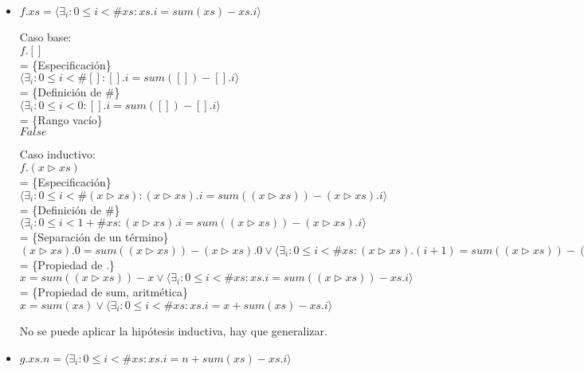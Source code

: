 \documentclass[12pt]{article}
\begin{document}
\begin{itemize}
    \item $ f.xs = \langle \exists_i : 0 \le i < \#xs : xs.i = sum(xs) - xs.i \rangle $

    \bigbreak 

    Caso base:\\
    $ f.[] $\\
    = \{Especificación\}\\
    $ \langle \exists_i : 0 \le i < \#[] : [].i = sum([]) - [].i \rangle $\\
    = \{Definición de \#\}\\
    $ \langle \exists_i : 0 \le i < 0 : [].i = sum([]) - [].i \rangle $\\
    = \{Rango vacío\}\\
    $ False $

    \bigbreak

    Caso inductivo:\\
    $ f.(x \triangleright xs) $\\
    = \{Especificación\}\\
    $ \langle \exists_i : 0 \le i < \#(x \triangleright xs) : (x \triangleright xs).i = sum((x \triangleright xs)) - (x \triangleright xs).i \rangle $\\
    = \{Definición de \#\}\\
    $ \langle \exists_i : 0 \le i < 1 + \#xs : (x \triangleright xs).i = sum((x \triangleright xs)) - (x \triangleright xs).i \rangle $\\
    = \{Separación de un término\}\\
    $ (x \triangleright xs).0 = sum((x \triangleright xs)) - (x \triangleright xs).0 \lor \langle \exists_i : 0 \le i < \#xs : (x \triangleright xs).(i + 1) = sum((x \triangleright xs)) - (x \triangleright xs).(i + 1) \rangle $\\
    = \{Propiedad de .\}\\
    $ x = sum((x \triangleright xs)) - x \lor \langle \exists_i : 0 \le i < \#xs : xs.i = sum((x \triangleright xs)) - xs.i \rangle $\\
    = \{Propiedad de sum, aritmética\}\\
    $ x = sum(xs) \lor \langle \exists_i : 0 \le i < \#xs : xs.i = x + sum(xs) - xs.i \rangle $

    \bigbreak

    No se puede aplicar la hipótesis inductiva, hay que generalizar.

    \item $ g.xs.n = \langle \exists_i : 0 \le i < \#xs : xs.i = n + sum(xs) - xs.i \rangle $


\end{itemize}
\end{document}
